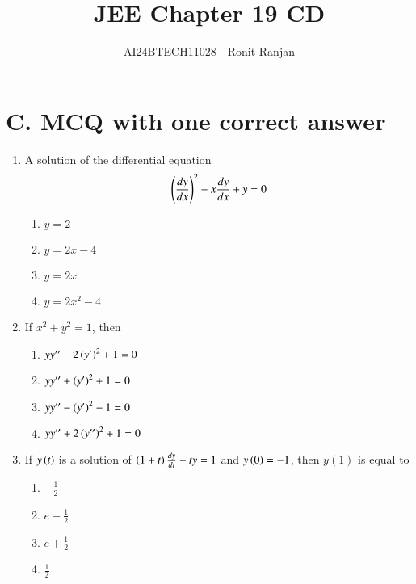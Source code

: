 \documentclass[journal,12pt,twocolumn]{IEEEtran}
\theoremstyle{remark}
\begin{document}

\vspace{3cm}

\title{JEE Chapter 19 CD}
\author{AI24BTECH11028 - Ronit Ranjan}
\maketitle
\newpage
\bigskip
\section*{C. MCQ with one correct answer}
\begin{enumerate}
\item A solution of the differential equation \hfill {}
\begin{align}
\left(\frac{dy}{dx}\right)^2 - x \frac{dy}{dx} + y = 0 
\end{align}
\begin{multicols}{2}
\begin{enumerate}
    \item $y = 2$
    \item $y = 2x -4$
    \item $y = 2x$
    \item $y = 2x^{2}-4$
\end{enumerate}
\end{multicols}

\item If $x^2 + y^2 = 1$, then \hfill {}
\begin{multicols}{2}
\begin{enumerate}
    \item  $yy^{\prime\prime}-2\left(y^\prime\right)^{2}+1 = 0$
    \item  $yy^{\prime\prime}+\left(y^\prime\right)^{2}+1 = 0$
    \item  $yy^{\prime\prime}-\left(y^\prime\right)^{2}-1 = 0$
    \item  $yy^{\prime\prime}+2\left(y'^\prime\right)^{2}+1 = 0$
\end{enumerate}
\end{multicols}

\item If $y\left(t\right)$ is a solution of $\left(1 + t\right) \frac{dy}{dt} - ty = 1$ and $y\left(0\right) = -1$, then $y(1)$ is equal to\hfill {}
\begin{multicols}{2}
\begin{enumerate}
    \item $-\frac{1}{2}$
    \item $e - \frac{1}{2}$
    \item $e + \frac{1}{2}$
    \item $\frac{1}{2}$
\end{enumerate}
\end{multicols}


\end{enumerate}
\end{document}
